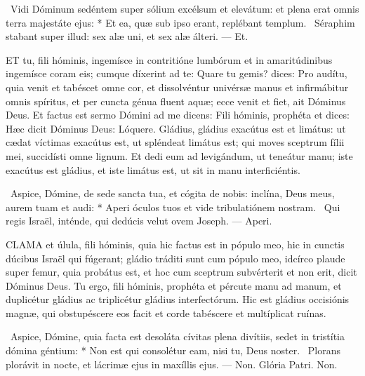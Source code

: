 \R\ Vidi Dóminum sedéntem super sólium excélsum et elevátum: et plena erat omnis terra majestáte ejus: * Et ea, quæ sub ipso erant, replébant templum. \V\ Séraphim stabant super illud: sex alæ uni, et sex alæ álteri. — Et.


\lettrine[lines=2]{E}{T} tu, fili hóminis, ingemísce in contritióne lumbórum et in amaritúdinibus ingemísce coram eis; cumque díxerint ad te: Quare tu gemis? dices: Pro audítu, quia venit et tabéscet omne cor, et dissolvéntur univérsæ manus et infirmábitur omnis spíritus, et per cuncta génua fluent aquæ; ecce venit et fiet, ait Dóminus Deus. Et factus est sermo Dómini ad me dicens: Fili hóminis, prophéta et dices: Hæc dicit Dóminus Deus: Lóquere. Gládius, gládius exacútus est et limátus: ut cædat víctimas exacútus est, ut spléndeat limátus est; qui moves sceptrum fílii mei, succidísti omne lignum. Et dedi eum ad levigándum, ut teneátur manu; iste exacútus est gládius, et iste limátus est, ut sit in manu interficiéntis.

\R\ Aspice, Dómine, de sede sancta tua, et cógita de nobis: inclína, Deus meus, aurem tuam et audi: * Aperi óculos tuos et vide tribulatiónem nostram. \V\ Qui regis Israël, inténde, qui dedúcis velut ovem Joseph. — Aperi.


\lettrine[lines=2]{C}{LAMA} et úlula, fili hóminis, quia hic factus est in pópulo meo, hic in cunctis dúcibus Israël qui fúgerant; gládio tráditi sunt cum pópulo meo, idcírco plaude super femur, quia probátus est, et hoc cum sceptrum subvérterit et non erit, dicit Dóminus Deus. Tu ergo, fili hóminis, prophéta et pércute manu ad manum, et duplicétur gládius ac triplicétur gládius interfectórum. Hic est gládius occisiónis magnæ, qui obstupéscere eos facit et corde tabéscere et multíplicat ruínas.

\R\ Aspice, Dómine, quia facta est desoláta cívitas plena divítiis, sedet in tristítia dómina géntium: * Non est qui consolétur eam, nisi tu, Deus noster. \V\ Plorans plorávit in nocte, et lácrimæ ejus in maxíllis ejus. — Non. Glória Patri. Non.





